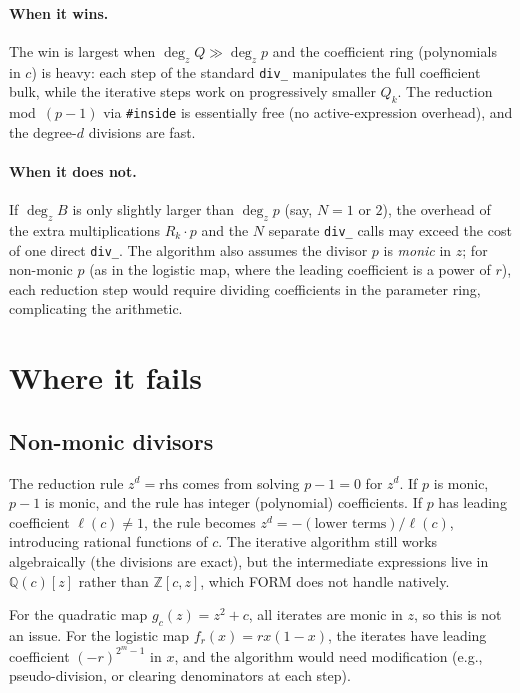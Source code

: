 \documentclass[11pt]{article}
\begin{document}
\paragraph{When it wins.}
The win is largest when $\deg_z Q\gg\deg_z p$ and the coefficient ring
(polynomials in $c$) is heavy: each step of the standard \texttt{div\_}
manipulates the full coefficient bulk, while the iterative steps work on
progressively smaller $Q_k$.  The reduction mod~$(p{-}1)$ via
\texttt{\#inside} is essentially free (no active-expression overhead), and
the degree-$d$ divisions are fast.

\paragraph{When it does not.}
If $\deg_z B$ is only slightly larger than $\deg_z p$ (say, $N=1$ or $2$),
the overhead of the extra multiplications $R_k\cdot p$ and the $N$ separate
\texttt{div\_} calls may exceed the cost of one direct \texttt{div\_}.  The
algorithm also assumes the divisor $p$ is \emph{monic} in $z$; for
non-monic $p$ (as in the logistic map, where the leading coefficient is a
power of $r$), each reduction step would require dividing coefficients in
the parameter ring, complicating the arithmetic.

\section{Where it fails}
\label{sec:fails}

\subsection{Non-monic divisors}

The reduction rule $z^d=\text{rhs}$ comes from solving $p-1=0$ for $z^d$.
If $p$ is monic, $p-1$ is monic, and the rule has integer (polynomial)
coefficients.  If $p$ has leading coefficient $\ell(c)\ne1$, the rule
becomes $z^d = -(\text{lower terms})/\ell(c)$, introducing rational
functions of $c$.  The iterative algorithm still works algebraically (the
divisions are exact), but the intermediate expressions live in
$\mathbb{Q}(c)[z]$ rather than $\mathbb{Z}[c,z]$, which FORM does not
handle natively.

For the quadratic map $g_c(z)=z^2+c$, all iterates are monic in $z$, so
this is not an issue.  For the logistic map $f_r(x)=rx(1{-}x)$, the
iterates have leading coefficient $(-r)^{2^m-1}$ in $x$, and the algorithm
would need modification (e.g., pseudo-division, or clearing denominators at
each step).
\end{document}
